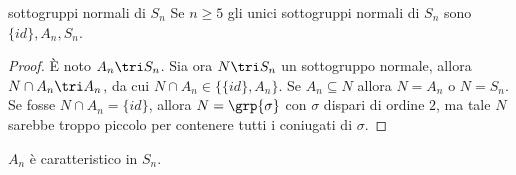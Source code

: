     
    


\begin{proposition}{sottogruppi normali di $S_n$}
    Se $n \geq 5$ gli unici sottogruppi normali di $S_n$ sono $\{id\}, A_n, S_n$.
\end{proposition}
\begin{proof}
    È noto $A_n \tri S_n$. Sia ora $N \tri S_n$ un sottogruppo normale, allora $N \cap A_n \tri A_n$, da cui $N \cap A_n \in \{ \{id\}, A_n \}$. Se $A_n \subseteq N$ allora $N = A_n$ o $N = S_n$. Se fosse $N \cap A_n = \{id\}$, allora $N = \grp{\sigma}$ con $\sigma$ dispari di ordine $2$, ma tale $N$ sarebbe troppo piccolo per contenere tutti i coniugati di $\sigma$.
\end{proof}
\begin{corollary2}
    $A_n$ è caratteristico in $S_n$.
\end{corollary2}


